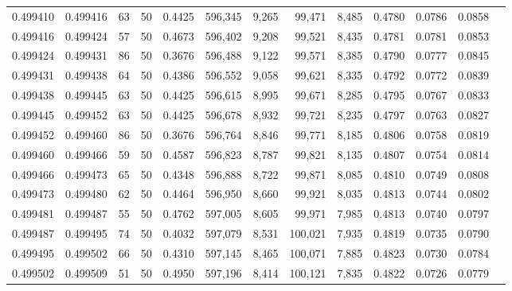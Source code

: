 \begin{tabular}{rrrrrrrrrrrrr}
0.499410 & 0.499416 &    63 &  50 &                                     0.4425 & 596,345 &   9,265 &  99,471 &   8,485 & 0.4780 & 0.0786 & 0.0858 \\
0.499416 & 0.499424 &    57 &  50 &                                     0.4673 & 596,402 &   9,208 &  99,521 &   8,435 & 0.4781 & 0.0781 & 0.0853 \\
0.499424 & 0.499431 &    86 &  50 &                                     0.3676 & 596,488 &   9,122 &  99,571 &   8,385 & 0.4790 & 0.0777 & 0.0845 \\
0.499431 & 0.499438 &    64 &  50 &                                     0.4386 & 596,552 &   9,058 &  99,621 &   8,335 & 0.4792 & 0.0772 & 0.0839 \\
0.499438 & 0.499445 &    63 &  50 &                                     0.4425 & 596,615 &   8,995 &  99,671 &   8,285 & 0.4795 & 0.0767 & 0.0833 \\
0.499445 & 0.499452 &    63 &  50 &                                     0.4425 & 596,678 &   8,932 &  99,721 &   8,235 & 0.4797 & 0.0763 & 0.0827 \\
0.499452 & 0.499460 &    86 &  50 &                                     0.3676 & 596,764 &   8,846 &  99,771 &   8,185 & 0.4806 & 0.0758 & 0.0819 \\
0.499460 & 0.499466 &    59 &  50 &                                     0.4587 & 596,823 &   8,787 &  99,821 &   8,135 & 0.4807 & 0.0754 & 0.0814 \\
0.499466 & 0.499473 &    65 &  50 &                                     0.4348 & 596,888 &   8,722 &  99,871 &   8,085 & 0.4810 & 0.0749 & 0.0808 \\
0.499473 & 0.499480 &    62 &  50 &                                     0.4464 & 596,950 &   8,660 &  99,921 &   8,035 & 0.4813 & 0.0744 & 0.0802 \\
0.499481 & 0.499487 &    55 &  50 &                                     0.4762 & 597,005 &   8,605 &  99,971 &   7,985 & 0.4813 & 0.0740 & 0.0797 \\
0.499487 & 0.499495 &    74 &  50 &                                     0.4032 & 597,079 &   8,531 & 100,021 &   7,935 & 0.4819 & 0.0735 & 0.0790 \\
0.499495 & 0.499502 &    66 &  50 &                                     0.4310 & 597,145 &   8,465 & 100,071 &   7,885 & 0.4823 & 0.0730 & 0.0784 \\
0.499502 & 0.499509 &    51 &  50 &                                     0.4950 & 597,196 &   8,414 & 100,121 &   7,835 & 0.4822 & 0.0726 & 0.0779 \\

\end{tabular}
